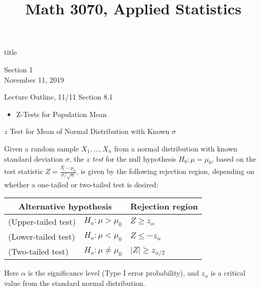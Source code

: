 \documentclass[t,handout]{beamer}
\title{Math 3070, Applied Statistics}
\newcommand{\nl}[1]{\vspace{#1 em}}
\begin{document}
\begin{frame}[c]
    \begin{beamercolorbox}[rounded=true,wd=\textwidth,center]{title}
        \inserttitle
    \end{beamercolorbox}
    \begin{center}
        Section 1\\
        \nl{0.5}
        November 11, 2019
    \end{center}
\end{frame}
\begin{frame}[c]{Lecture Outline, 11/11}
    Section 8.1
    \begin{itemize}
        \item Z-Tests for Population Mean
    \end{itemize}
\end{frame}

\begin{frame}{$z$ Test for Mean of Normal Distribution with Known $\sigma$}
    \begin{block}{}
    Given a random sample $X_1,\dots,X_n$ from a normal distribution with known standard deviation $\sigma$, the \emph{$z$ test} for the null hypothesis $H_0: \mu=\mu_0$, based on the test statistic $Z=\frac{\overline X-\mu_0}{\sigma/\sqrt{n}}$, is given by the following rejection region, depending on whether a one-tailed or two-tailed test is desired:
    \begin{center}
    \begin{tabular}{ll|l}
    \multicolumn{2}{c}{Alternative hypothesis} & Rejection region \\ \hline
    (Upper-tailed test) & $H_a: \mu>\mu_0$ & $Z\geq z_{\alpha}$ \\
    (Lower-tailed test) & $H_a: \mu<\mu_0$ & $Z\leq -z_{\alpha}$ \\
    (Two-tailed test) & $H_a: \mu\neq\mu_0$ & $|Z|\geq z_{\alpha/2}$\\
    \end{tabular}
    \end{center}
    Here $\alpha$ is the significance level (Type I error probability), and $z_{\alpha}$ is a critical value from the standard normal distribution.
    \end{block}
    \end{frame}
    
\end{document}
